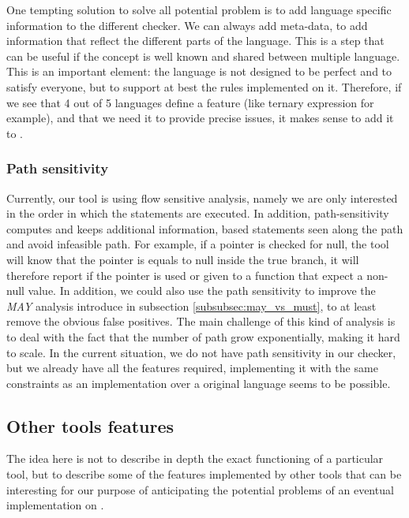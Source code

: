 One tempting solution to solve all potential problem is to add language specific information to the different checker.
We can always add meta-data, to add information that reflect the different parts of the language. 
This is a step that can be useful if the concept is well known and shared between multiple language. 
This is an important element: the language is not designed to be perfect and to satisfy everyone, but to support at best the rules implemented on it. 
Therefore, if we see that 4 out of 5 languages define a feature (like ternary expression for example), and that we need it to provide precise issues, it makes sense to add it to \slang.


\subsubsection{Path sensitivity}
\label{subsubsec:path_sensitivity}

Currently, our tool is using flow sensitive analysis, namely we are only interested in the order in which the statements are executed. 
In addition, path-sensitivity computes and keeps additional information, based statements seen along the path and avoid infeasible path. 
For example, if a pointer is checked for null, the tool will know that the pointer is equals to null inside the true branch, it will therefore report if the pointer is used or given to a function that expect a non-null value. 
In addition, we could also use the path sensitivity to improve the \emph{MAY} analysis introduce in subsection \ref{subsubsec:may_vs_must}, to at least remove the obvious false positives. 
The main challenge of this kind of analysis is to deal with the fact that the number of path grow exponentially, making it hard to scale. 
In the current situation, we do not have path sensitivity in our checker, but we already have all the features required, implementing it with the same constraints as an implementation over a original language seems to be possible.

\subsection{Other tools features}
\label{subsec:other_tools_features}

The idea here is not to describe in depth the exact functioning of a particular tool, but to describe some of the features implemented by other tools that can be interesting for our purpose of anticipating the potential problems of an eventual implementation on \slang.

